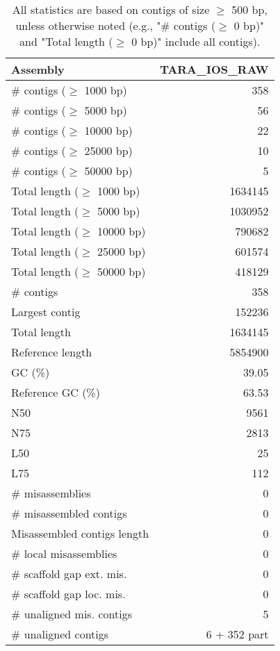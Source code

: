 \documentclass[12pt,a4paper]{article}
\begin{document}
\begin{table}[ht]
\begin{center}
\caption{All statistics are based on contigs of size $\geq$ 500 bp, unless otherwise noted (e.g., "\# contigs ($\geq$ 0 bp)" and "Total length ($\geq$ 0 bp)" include all contigs).}
\begin{tabular}{|l*{1}{|r}|}
\hline
Assembly & TARA\_IOS\_RAW \\ \hline
\# contigs ($\geq$ 1000 bp) & 358 \\ \hline
\# contigs ($\geq$ 5000 bp) & 56 \\ \hline
\# contigs ($\geq$ 10000 bp) & 22 \\ \hline
\# contigs ($\geq$ 25000 bp) & 10 \\ \hline
\# contigs ($\geq$ 50000 bp) & 5 \\ \hline
Total length ($\geq$ 1000 bp) & 1634145 \\ \hline
Total length ($\geq$ 5000 bp) & 1030952 \\ \hline
Total length ($\geq$ 10000 bp) & 790682 \\ \hline
Total length ($\geq$ 25000 bp) & 601574 \\ \hline
Total length ($\geq$ 50000 bp) & 418129 \\ \hline
\# contigs & 358 \\ \hline
Largest contig & 152236 \\ \hline
Total length & 1634145 \\ \hline
Reference length & 5854900 \\ \hline
GC (\%) & 39.05 \\ \hline
Reference GC (\%) & 63.53 \\ \hline
N50 & 9561 \\ \hline
N75 & 2813 \\ \hline
L50 & 25 \\ \hline
L75 & 112 \\ \hline
\# misassemblies & 0 \\ \hline
\# misassembled contigs & 0 \\ \hline
Misassembled contigs length & 0 \\ \hline
\# local misassemblies & 0 \\ \hline
\# scaffold gap ext. mis. & 0 \\ \hline
\# scaffold gap loc. mis. & 0 \\ \hline
\# unaligned mis. contigs & 5 \\ \hline
\# unaligned contigs & 6 + 352 part \\ \hline

\end{tabular}
\end{center}
\end{table}
\end{document}

